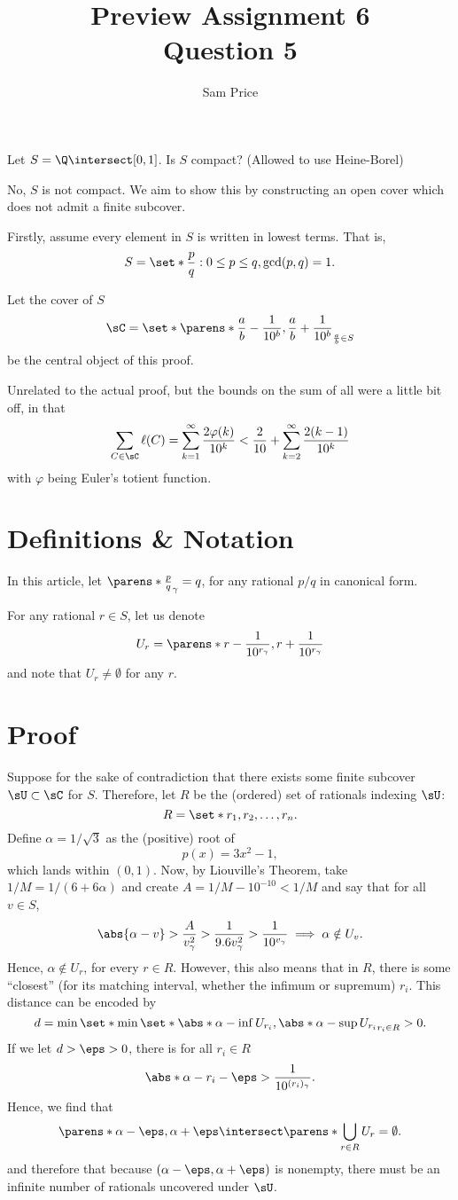 \documentclass{article}
\author{Sam Price}
\date{}
\title{Preview Assignment 6\\\Large{Question 5}}
\newcommand{\Rt}[1]{\dfrac{1}{10^{#1}}}
\begin{document}
\maketitle

Let $S = \Q \intersect [0, 1]$. Is $S$ compact? (Allowed to use Heine-Borel)
\vspace{0.5cm}

No, $S$ is not compact. We aim to show this by constructing an open cover which does not admit a finite subcover.

Firstly, assume every element in $S$ is written in lowest terms. That is,
\[ S = \set*{\frac{p}{q} : 0 \le p \le q, \gcd(p, q) = 1 }. \]

Let the cover of $S$
\[ \sC = \set*{\parens*{\frac{a}{b} - \Rt{b}, \frac{a}{b} + \Rt{b}}}_{\frac{a}{b} \in S} \]
be the central object of this proof.

Unrelated to the actual proof, but the bounds on the sum of all were a little bit off, in that
\[
  \sum_{C \in \sC} \ell(C) = \sum_{k = 1}^{\infty}\frac{2\varphi(k)}{10^{k}}
  < \frac{2}{10} + \sum_{k = 2}^{\infty}\frac{2(k - 1)}{10^{k}}
\]
with $\varphi$ being Euler's totient function.


\section{Definitions \& Notation}
In this article, let $\parens*{\frac{p}{q}}_{\gamma} = q$, for any rational $p/q$ in canonical form.

For any rational $r \in S$, let us denote
\[ U_{r} = \parens*{r - \Rt{r_{\gamma}}, r + \Rt{r_{\gamma}}} \]
and note that $U_{r} \ne \emptyset$ for any $r$.

\section{Proof}

Suppose for the sake of contradiction that there exists some finite subcover $\sU \subset \sC$ for $S$.
Therefore, let $R$ be the (ordered) set of rationals indexing $\sU$:
\[ R = \set*{r_{1}, r_{2}, \ldots, r_{n}}. \]
Define $\alpha = 1/\!\sqrt{3}$ as the (positive) root of
\[ p(x) = 3x^{2} - 1, \]
which lands within $(0, 1)$.
Now, by Liouville's Theorem, take $1/M = 1/(6 + 6\alpha)$ and create $A = 1/M - 10^{-10} < 1/M$
and say that for all $v \in S$,
\[ \abs{\alpha - v} > \frac{A}{v_{\gamma}^{2}} > \frac{1}{9.6v_{\gamma}^{2}} > \frac{1}{10^{v_{\gamma}}} \implies \alpha \notin U_{v}. \]
Hence, $\alpha \notin U_{r}$, for every $r \in R$.
However, this also means that in $R$, there is some ``closest''
(for its matching interval, whether the infimum or supremum) $r_{i}$.
This distance can be encoded by
\[ d = \min\set*{\min\set*{\abs*{\alpha - \inf U_{r_{i}}}, \abs*{\alpha - \sup U_{r_{i}}}}_{r_{i} \in R}} > 0. \]
If we let $d > \eps > 0$, there is for all $r_{i} \in R$
\[
  \abs*{\alpha - r_{i}} - \eps > \Rt{(r_{i})_{\gamma}}.
\]
Hence, we find that
\[
  \parens*{\alpha - \eps, \alpha + \eps} \intersect \parens*{\bigcup_{r \in R}U_{r}} = \emptyset.
\]
and therefore that because $(\alpha - \eps, \alpha + \eps)$ is nonempty,
there must be an infinite number of rationals uncovered under $\sU$.
\end{document}
